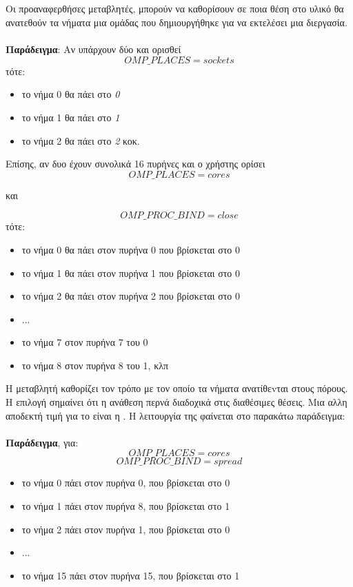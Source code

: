 \paragraph{\emph{}}
\subparagraph{}
Οι προαναφερθήσες μεταβλητές, μπορούν να καθορίσουν σε ποια θέση στο υλικό θα ανατεθούν τα νήματα μια ομάδας που
δημιουργήθηκε για να εκτελέσει μια διεργασία. \ \\
\textbf{Παράδειγμα}: Αν υπάρχουν δύο \emph{} και ορισθεί $$OMP\_PLACES=sockets$$ τότε:
\begin{itemize}
\item{το νήμα 0 θα πάει στο \emph{ 0}}
\item{το νήμα 1 θα πάει στο \emph{ 1}}
\item{το νήμα 2 θα πάει στο \emph{ 2}} κοκ.
\end{itemize}

Επίσης, αν δυο \emph{} έχουν συνολικά 16 πυρήνες και ο χρήστης ορίσει $$OMP\_PLACES=cores$$
\begin{center}και\end{center} $$OMP\_PROC\_BIND=close$$ 
\clearpage
τότε:
\begin{itemize}
\item{το νήμα 0	θα πάει στον πυρήνα 0 που βρίσκεται στο \emph{} 0}
\item{το νήμα 1	θα πάει στον πυρήνα 1 που βρίσκεται στο \emph{} 0}
\item{το νήμα 2	θα πάει στον πυρήνα 2 που βρίσκεται στο \emph{} 0}
\item{...}
\item{το νήμα 7 στον πυρήνα 7 του \emph{} 0}
\item{το νήμα 8 στον πυρήνα 8 του \emph{} 1, κλπ}
\end{itemize}

Η μεταβλητή \emph{} καθορίζει τον τρόπο με τον οποίο τα νήματα ανατίθεvται στους πόρους. Η επιλογή
\emph{} σημαίνει ότι η ανάθεση περνά διαδοχικά στις διαθέσιμες θέσεις. Μια αλλη αποδεκτή
τιμή για το \emph{} είναι η \emph{}. Η λειτουργία της φαίνεται στο παρακάτω παράδειγμα: 
\ \\
\ \\
\textbf{Παράδειγμα}, για:
$$OMP\_PLACES=cores$$
$$OMP\_PROC\_BIND=spread$$

\begin{itemize}
\item{το νήμα 0 πάει στον πυρήνα 0, που βρίσκεται στο \emph{} 0}
\item{το νήμα 1 πάει στον πυρήνα 8, που βρίσκεται στο \emph{} 1}
\item{το νήμα 2 πάει στον πυρήνα 1, που βρίσκεται στο \emph{} 0}
\item{...}
\item{το νήμα 15 πάει στον πυρήνα 15, που βρίσκεται στο \emph{} 1}
\end{itemize}

